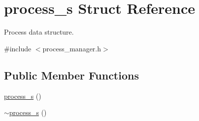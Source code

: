 \hypertarget{structprocess__s}{
\section{process\_\-s Struct Reference}
\label{structprocess__s}
}


Process data structure.  




{\ttfamily \#include $<$process\_\-manager.h$>$}

\subsection*{Public Member Functions}
\begin{DoxyCompactItemize}
\item 
\hyperlink{structprocess__s_a837742357aae46f13f2961950397dd76}{process\_\-s} ()
\item 
\hyperlink{structprocess__s_ab0b2900fe44e2e0f3fe45017b26c8ff0}{$\sim$process\_\-s} ()
\end{DoxyCompactItemize}
